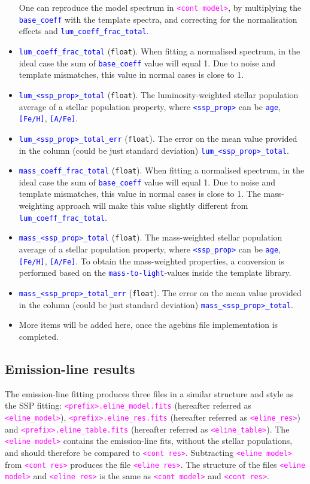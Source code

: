 \documentclass[usenatbib,usegraphicx,useAMS,onecolumn]{mn2e}
\newcommand{\codeline}[1]{\lstinline|#1|}
\newcommand{\tblcol}[1]{\textcolor{blue}{\codeline{#1}}}
\newcommand{\fname}[1]{\textcolor{magenta}{\codeline{#1}}}
\begin{document}
\begin{itemize}
        One can reproduce the model spectrum in \fname{<cont model>}, by multiplying the \tblcol{base_coeff} with the template spectra, and correcting for the normalisation effects and \tblcol{lum_coeff_frac_total}.
    \item \tblcol{lum_coeff_frac_total} (\texttt{float}).
        When fitting a normalised spectrum, in the ideal case the sum of \tblcol{base_coeff} value will equal 1.
        Due to noise and template mismatches, this value in normal cases is close to 1.
    \item \tblcol{lum_<ssp_prop>_total} (\texttt{float}).
        The luminosity-weighted stellar population average of a stellar population property, where \tblcol{<ssp_prop>} can be \tblcol{age}, \tblcol{[Fe/H]}, \tblcol{[A/Fe]}.
    \item \tblcol{lum_<ssp_prop>_total_err} (\texttt{float}).
        The error on the mean value provided in the column (could be just standard deviation) \tblcol{lum_<ssp_prop>_total}.
    \item \tblcol{mass_coeff_frac_total} (\texttt{float}).
        When fitting a normalised spectrum, in the ideal case the sum of \tblcol{base_coeff} value will equal 1.
        Due to noise and template mismatches, this value in normal cases is close to 1.
        The mass-weighting approach will make this value slightly different from \tblcol{lum_coeff_frac_total}.
    \item \tblcol{mass_<ssp_prop>_total} (\texttt{float}).
        The mass-weighted stellar population average of a stellar population property, where \tblcol{<ssp_prop>} can be \tblcol{age}, \tblcol{[Fe/H]}, \tblcol{[A/Fe]}.
        To obtain the mass-weighted properties, a conversion is performed based on the \tblcol{mass-to-light}-values inside the template library.
    \item \tblcol{mass_<ssp_prop>_total_err} (\texttt{float}).
        The error on the mean value provided in the column (could be just standard deviation) \tblcol{mass_<ssp_prop>_total}.
    \item More items will be added here, once the agebins file implementation is completed.
\end{itemize}

\subsection{Emission-line results}
\label{subsec:usage_output_line}
The emission-line fitting produces three files in a similar structure and style as the SSP fitting: \fname{<prefix>.eline_model.fits} (hereafter referred as \fname{<eline_model>}), \fname{<prefix>.eline_res.fits} (hereafter referred as \fname{<eline_res>}) and \fname{<prefix>.eline_table.fits} (hereafter referred as \fname{<eline_table>}).
The \fname{<eline model>} contains the emission-line fits, without the stellar populations, and should therefore be compared to \fname{<cont res>}.
Subtracting \fname{<eline model>} from \fname{<cont res>} produces the file \fname{<eline res>}.
The structure of the files \fname{<eline model>} and \fname{<eline res>} is the same as \fname{<cont model>} and \fname{<cont res>}.
\end{document}
